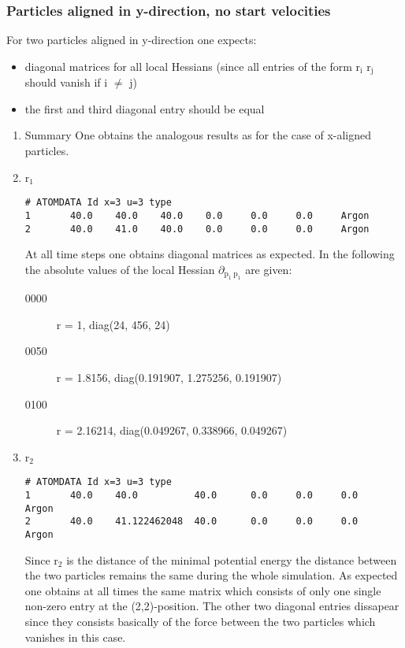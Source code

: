 \documentclass[11pt]{article}
\begin{document}
\subsubsection{Particles aligned in y-direction, no start velocities}
\label{sec-1-4-2}
For two particles aligned in y-direction one expects:
\begin{itemize}
\item diagonal matrices for all local Hessians (since all entries of the form r$_{\text{i}}$ r$_{\text{j}}$ should vanish if i $\neq$ j)
\item the first and third diagonal entry should be equal
\end{itemize}
\begin{enumerate}
\item Summary
\label{sec-1-4-2-1}
One obtains the analogous results as for the case of x-aligned particles.
\item r$_{\text{1}}$
\label{sec-1-4-2-2}
\begin{verbatim}
# ATOMDATA Id x=3 u=3 type
1       40.0    40.0    40.0    0.0     0.0     0.0     Argon
2       40.0    41.0    40.0    0.0     0.0     0.0     Argon
\end{verbatim}
At all time steps one obtains diagonal matrices as expected.
In the following the absolute values of the local Hessian $\partial$$_{\text{p}_{\text{1}} \ \text{p}_{\text{1}}}$ are given:
\begin{description}
\item[{0000}] r = 1, diag(24, 456, 24)
\item[{0050}] r = 1.8156, diag(0.191907, 1.275256, 0.191907)
\item[{0100}] r = 2.16214, diag(0.049267, 0.338966, 0.049267)
\end{description}
\item r$_{\text{2}}$
\label{sec-1-4-2-3}
\begin{verbatim}
# ATOMDATA Id x=3 u=3 type
1       40.0    40.0          40.0      0.0     0.0     0.0     Argon
2       40.0    41.122462048  40.0      0.0     0.0     0.0     Argon
\end{verbatim}
Since r$_{\text{2}}$ is the distance of the minimal potential energy the distance between the two particles remains the same during the whole simulation.
As expected one obtains at all times the same matrix which consists of only one single non-zero entry at the (2,2)-position.
The other two diagonal entries dissapear since they consists basically of the force between the two particles which vanishes in this case.
$$
\end{enumerate}
\end{document}

